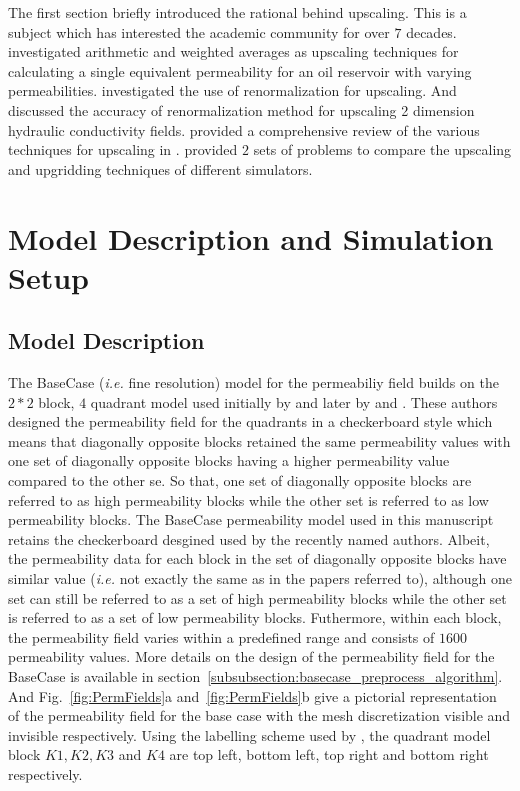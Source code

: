 \documentclass[preprint,12pt]{elsarticle}
\begin{document}
The first section briefly introduced the rational behind upscaling. This is a subject which has interested the academic community for over $7$ decades.  \citet{Cardwell_1945} investigated arithmetic and weighted averages as upscaling techniques for calculating a single equivalent permeability for an oil reservoir with varying permeabilities. \citet{King1996} investigated the use of renormalization for upscaling. And \citet{Yeo2001} discussed the accuracy of renormalization method for upscaling 2 dimension hydraulic conductivity fields.  \citet{Renard_1997} provided a comprehensive review of the various techniques for upscaling in \citeyear{Renard_1997}. \citet{Christie_2001SPE10Model} provided $2$ sets of problems to compare the upscaling and upgridding techniques of different simulators.

\section{Model Description and Simulation Setup}\label{section:model_simulation}

\subsection{Model Description}\label{subsection:model}
The BaseCase  ({\it i.e.} fine resolution) model for the permeabiliy field builds on the $2 * 2$ block, $4$ quadrant model used initially by \citet{Cardwell_1945} and later by \citet{Yeo2001} and \citet{dawe_2008}. These authors designed the permeability field for the quadrants in a checkerboard style which means that diagonally opposite blocks retained the same permeability values with one set of diagonally opposite blocks having a higher permeability value compared to the other se. So that, one set of diagonally opposite blocks are referred to as high permeability blocks while the other set is referred to as low permeability blocks. The BaseCase permeability model used in this manuscript retains the checkerboard desgined used by the recently named authors. Albeit, the permeability data for each block in the set of diagonally opposite blocks have similar value ({\it i.e.} not exactly the same as in the papers referred to), although one set can still be referred to as a set of high permeability blocks while the other set is referred to as a set of low permeability blocks. Futhermore, within each block, the permeability field varies within a predefined range and consists of $1600$ permeability values. More details on the design of the permeability field for the BaseCase is available in section~\ref{subsubsection:basecase_preprocess_algorithm}. And Fig.~\ref{fig:PermFields}a and~\ref{fig:PermFields}b give a pictorial representation of the permeability field for the base case with the mesh discretization visible and invisible respectively. Using the labelling scheme used by \citet{dawe_2008}, the quadrant model block $K1, K2, K3$ and $K4$ are top left, bottom left, top right and bottom right respectively.
\end{document}
